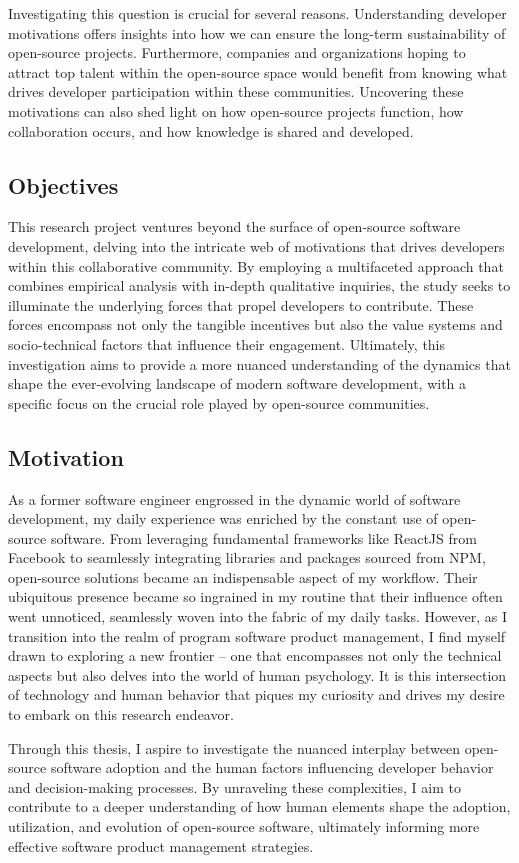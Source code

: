 Investigating this question is crucial for several reasons. Understanding developer motivations offers insights into how we can ensure the long-term sustainability of open-source projects. Furthermore, companies and organizations hoping to attract top talent within the open-source space would benefit from knowing what drives developer participation within these communities.  Uncovering these motivations can also shed light on how open-source projects function, how collaboration occurs, and how knowledge is shared and developed.

\subsection{Objectives}

This research project ventures beyond the surface of open-source software development, delving into the intricate web of motivations that drives developers within this collaborative community. By employing a multifaceted approach that combines empirical analysis with in-depth qualitative inquiries, the study seeks to illuminate the underlying forces that propel developers to contribute. These forces encompass not only the tangible incentives but also the value systems and socio-technical factors that influence their engagement. Ultimately, this investigation aims to provide a more nuanced understanding of the dynamics that shape the ever-evolving landscape of modern software development, with a specific focus on the crucial role played by open-source communities.

\subsection{Motivation}

As a former software engineer engrossed in the dynamic world of software development, my daily experience was enriched by the constant use of open-source software. From leveraging fundamental frameworks like ReactJS from Facebook to seamlessly integrating libraries and packages sourced from NPM, open-source solutions became an indispensable aspect of my workflow. Their ubiquitous presence became so ingrained in my routine that their influence often went unnoticed, seamlessly woven into the fabric of my daily tasks. However, as I transition into the realm of program software product management, I find myself drawn to exploring a new frontier – one that encompasses not only the technical aspects but also delves into the world of human psychology. It is this intersection of technology and human behavior that piques my curiosity and drives my desire to embark on this research endeavor. 

Through this thesis, I aspire to investigate the nuanced interplay between open-source software adoption and the human factors influencing developer behavior and decision-making processes. By unraveling these complexities, I aim to contribute to a deeper understanding of how human elements shape the adoption, utilization, and evolution of open-source software, ultimately informing more effective software product management strategies.


\clearpage  %
